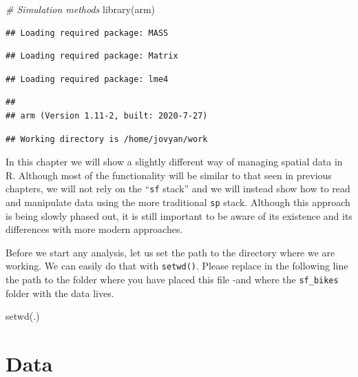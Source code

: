 \documentclass[
]{book}
\newenvironment{Shaded}{\begin{snugshade}}{\end{snugshade}}
\newcommand{\CommentTok}[1]{\textcolor[rgb]{0.56,0.35,0.01}{\textit{#1}}}
\newcommand{\FunctionTok}[1]{\textcolor[rgb]{0.00,0.00,0.00}{#1}}
\newcommand{\NormalTok}[1]{#1}
\newcommand{\StringTok}[1]{\textcolor[rgb]{0.31,0.60,0.02}{#1}}
\begin{document}
\begin{Shaded}
\begin{Highlighting}[]
\CommentTok{\# Simulation methods}
\FunctionTok{library}\NormalTok{(arm)}
\end{Highlighting}
\end{Shaded}

\begin{verbatim}
## Loading required package: MASS
\end{verbatim}

\begin{verbatim}
## Loading required package: Matrix
\end{verbatim}

\begin{verbatim}
## Loading required package: lme4
\end{verbatim}

\begin{verbatim}
## 
## arm (Version 1.11-2, built: 2020-7-27)
\end{verbatim}

\begin{verbatim}
## Working directory is /home/jovyan/work
\end{verbatim}

In this chapter we will show a slightly different way of managing spatial data in R. Although most of the functionality will be similar to that seen in previous chapters, we will not rely on the ``\texttt{sf} stack'' and we will instead show how to read and manipulate data using the more traditional \texttt{sp} stack. Although this approach is being slowly phased out, it is still important to be aware of its existence and its differences with more modern approaches.

Before we start any analysis, let us set the path to the directory where we are working. We can easily do that with \texttt{setwd()}. Please replace in the following line the path to the folder where you have placed this file -and where the \texttt{sf\_bikes} folder with the data lives.

\begin{Shaded}
\begin{Highlighting}[]
\FunctionTok{setwd}\NormalTok{(}\StringTok{\textquotesingle{}.\textquotesingle{}}\NormalTok{)}
\end{Highlighting}
\end{Shaded}

\hypertarget{data-1}{%
\section{Data}\label{data-1}}
\end{document}
